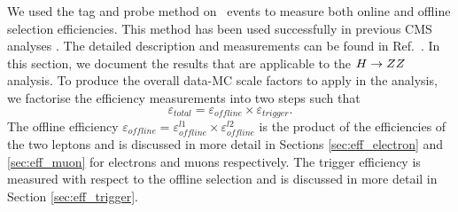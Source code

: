  
We used the tag and probe method on \dyll~events to measure both online and offline selection efficiencies.
This method has been used successfully in previous CMS analyses 
\cite{ref:tagprobe_mit_w}\cite{ref:tagprobe_snt_top}\cite{HWW2010}. The detailed description and 
measurements can be found in Ref.~\cite{HWW2011AN}. In this section, we document the results 
that are applicable to the $H\to ZZ$ analysis. 
To produce the overall data-MC scale factors to apply in the analysis, we factorise the efficiency measurements
into two steps such that
\begin{equation}
\varepsilon_{total} = \varepsilon_{offline} \times \varepsilon_{trigger}.
\end{equation}
The offline efficiency $\varepsilon_{offline} = \varepsilon_{offline}^{l1} \times \varepsilon_{offline}^{l2}$
is the product of the efficiencies of the two leptons and is discussed in more detail in Sections \ref{sec:eff_electron}
and \ref{sec:eff_muon} for electrons and muons respectively.
The trigger efficiency is measured with respect to the offline selection and
is discussed in more detail in Section \ref{sec:eff_trigger}.
